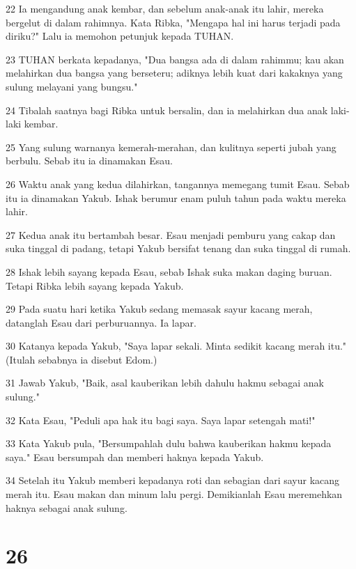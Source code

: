 \par 22 Ia mengandung anak kembar, dan sebelum anak-anak itu lahir, mereka bergelut di dalam rahimnya. Kata Ribka, "Mengapa hal ini harus terjadi pada diriku?" Lalu ia memohon petunjuk kepada TUHAN.
\par 23 TUHAN berkata kepadanya, "Dua bangsa ada di dalam rahimmu; kau akan melahirkan dua bangsa yang berseteru; adiknya lebih kuat dari kakaknya yang sulung melayani yang bungsu."
\par 24 Tibalah saatnya bagi Ribka untuk bersalin, dan ia melahirkan dua anak laki-laki kembar.
\par 25 Yang sulung warnanya kemerah-merahan, dan kulitnya seperti jubah yang berbulu. Sebab itu ia dinamakan Esau.
\par 26 Waktu anak yang kedua dilahirkan, tangannya memegang tumit Esau. Sebab itu ia dinamakan Yakub. Ishak berumur enam puluh tahun pada waktu mereka lahir.
\par 27 Kedua anak itu bertambah besar. Esau menjadi pemburu yang cakap dan suka tinggal di padang, tetapi Yakub bersifat tenang dan suka tinggal di rumah.
\par 28 Ishak lebih sayang kepada Esau, sebab Ishak suka makan daging buruan. Tetapi Ribka lebih sayang kepada Yakub.
\par 29 Pada suatu hari ketika Yakub sedang memasak sayur kacang merah, datanglah Esau dari perburuannya. Ia lapar.
\par 30 Katanya kepada Yakub, "Saya lapar sekali. Minta sedikit kacang merah itu." (Itulah sebabnya ia disebut Edom.)
\par 31 Jawab Yakub, "Baik, asal kauberikan lebih dahulu hakmu sebagai anak sulung."
\par 32 Kata Esau, "Peduli apa hak itu bagi saya. Saya lapar setengah mati!"
\par 33 Kata Yakub pula, "Bersumpahlah dulu bahwa kauberikan hakmu kepada saya." Esau bersumpah dan memberi haknya kepada Yakub.
\par 34 Setelah itu Yakub memberi kepadanya roti dan sebagian dari sayur kacang merah itu. Esau makan dan minum lalu pergi. Demikianlah Esau meremehkan haknya sebagai anak sulung.

\chapter{26}

